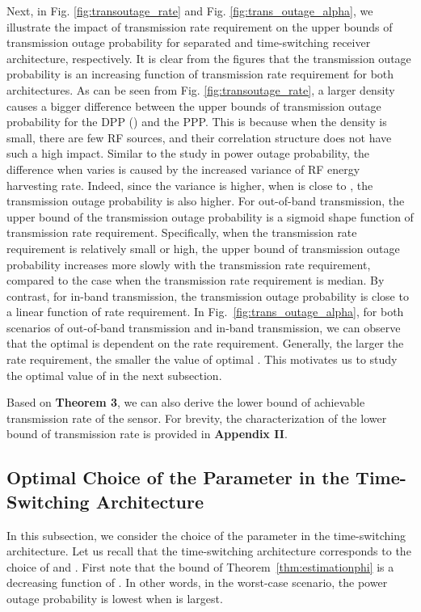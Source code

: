 \documentclass[12pt,draftclsnofoot,onecolumn]{IEEEtran}
\begin{document}
    
Next, in Fig. \ref{fig:transoutage_rate} and Fig. \ref{fig:trans_outage_alpha}, we illustrate the impact of transmission rate requirement on the upper bounds of transmission outage probability for separated and time-switching receiver architecture, respectively. It is clear from the figures that the transmission outage probability is an increasing function of transmission rate requirement for both architectures.
As can be seen from Fig. \ref{fig:transoutage_rate}, 
a larger density  causes a bigger difference between the upper bounds of transmission outage probability for the DPP () and the PPP. This is because when the density  is small, there are few RF sources, and their correlation structure does not have such a high impact.
Similar to the study in power outage probability, the difference when  varies is caused by the increased variance of RF energy harvesting rate. Indeed, since the variance is higher, when  is close to , the transmission outage probability is also higher.
For out-of-band transmission, the upper bound of the transmission outage probability is a sigmoid shape function of transmission rate requirement. Specifically, when the transmission rate requirement is relatively small or high, the upper bound of transmission outage probability increases more slowly with the transmission rate requirement, compared to the case when the transmission rate requirement is median. By contrast, for in-band transmission, the transmission outage probability is close to a linear function of rate requirement. In Fig.~\ref{fig:trans_outage_alpha}, for both scenarios of out-of-band transmission and in-band transmission, we can observe that the optimal  is dependent on the rate requirement. Generally, the larger the rate requirement, the smaller the value of optimal . This motivates us to study the optimal value of  in the next subsection.  

  
Based on {\bf Theorem 3}, we can also derive the lower bound of achievable transmission rate of the sensor. For brevity, the characterization of the lower bound of transmission rate is provided in {\bf Appendix II}.  

\subsection{Optimal Choice of the Parameter in the Time-Switching Architecture}
\label{subsec:optimaltau}
 
In this subsection, we consider the choice of the parameter  in the time-switching architecture. Let us recall that the time-switching architecture corresponds to the choice of  and . First note that the bound of Theorem~\ref{thm:estimationphi} is a decreasing function of . In other words, in the worst-case scenario,  the power outage probability is lowest when  is largest.
\end{document}
